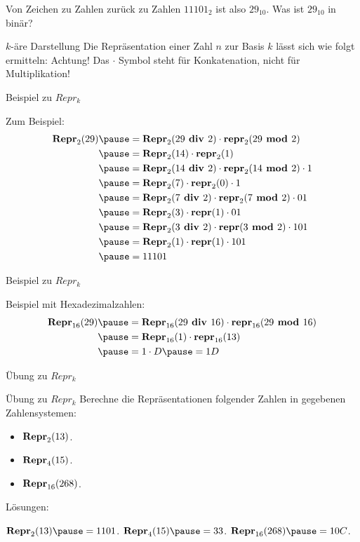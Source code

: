 \begin{frame}{Von Zeichen zu Zahlen zurück zu Zahlen}
	$11101_2$ ist also $29_{10}$. \p Was ist $29_{10}$ in binär? \pause
	\begin{block}{$k$-äre Darstellung}
		Die Repräsentation einer Zahl $n$ \p zur Basis $k$ \p lässt sich wie folgt ermitteln:\p
		\p Achtung! \p Das $\cdot$ Symbol steht für Konkatenation, nicht für Multiplikation!
	\end{block}
\end{frame}

\begin{frame}{Beispiel zu $Repr_k$}
	
	\pause Zum Beispiel: \p 
	\begin{align*}
	\fRepr_2(29) \p &= \fRepr_2(29 \fdiv 2) \cdot \frepr_2(29 \fmod 2)  \\
	\p &= \fRepr_2(14) \cdot \frepr_2(1)\\
	\p &= \fRepr_2(14 \fdiv 2) \cdot \frepr_2(14 \fmod 2) \cdot 1\\
	\p &= \fRepr_2(7) \cdot \frepr_2(0) \cdot 1\\
	\p &= \fRepr_2(7 \fdiv 2) \cdot \frepr_2(7 \fmod 2) \cdot 01\\
	\p &= \fRepr_2(3) \cdot \frepr(1) \cdot 01\\
	\p &= \fRepr_2(3 \fdiv 2) \cdot \frepr(3 \fmod 2) \cdot 101\\
	\p &= \fRepr_2(1) \cdot \frepr(1) \cdot 101\\
	\p &= 11101
	\end{align*}
\end{frame}
\newcommand{\uhd}{_{16}}

\begin{frame}{Beispiel zu $Repr_k$}

\pause Beispiel mit Hexadezimalzahlen: \p 
\begin{align*}
\fRepr\uhd (29) \p &= \fRepr\uhd (29 \fdiv 16) \cdot \frepr\uhd (29 \fmod 16)  \\
\p &= \fRepr\uhd (1) \cdot \frepr\uhd (13)\\
\p &= 1 \cdot D \p = 1D
\end{align*}
\end{frame}

\begin{frame}{Übung zu $Repr_k$}
	\begin{taskblock}{Übung zu $Repr_k$}
		Berechne die Repräsentationen folgender Zahlen in gegebenen Zahlensystemen:
		\begin{itemize}
			\item $\textbf{Repr}_2(13)$.
			\item $\textbf{Repr}_4(15)$.
			\item $\fRepr\uhd (268)$.
		\end{itemize}
	\end{taskblock}

	\pause Lösungen:
	\begin{itemize}
		\pitem $\fRepr_2(13) \p = 1101$.
		\pitem $\fRepr_4(15) \p = 33$.
		\pitem $\fRepr\uhd (268) \p = 10C$.
	\end{itemize}
\end{frame}

